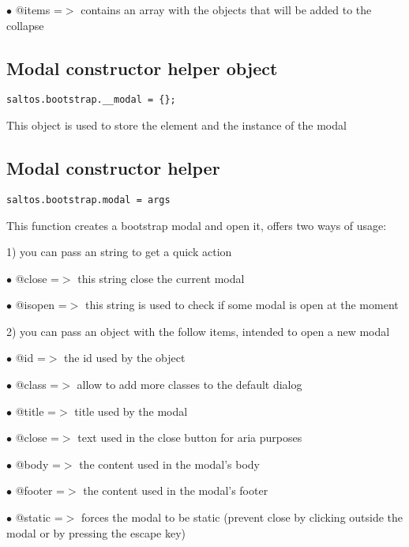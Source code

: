 \documentclass[a4paper]{book}
\begin{document}
\begin{compactitem}
\item[\color{myblue}$\bullet$] @items =$>$ contains an array with the objects that will be added to the collapse
\end{compactitem}

\hypertarget{toc473}{}
\subsection{Modal constructor helper object}

\begin{lstlisting}
saltos.bootstrap.__modal = {};
\end{lstlisting}

This object is used to store the element and the instance of the modal

\hypertarget{toc474}{}
\subsection{Modal constructor helper}

\begin{lstlisting}
saltos.bootstrap.modal = args
\end{lstlisting}

This function creates a bootstrap modal and open it, offers two ways of usage:

1) you can pass an string to get a quick action

\begin{compactitem}
\item[\color{myblue}$\bullet$] @close  =$>$ this string close the current modal
\item[\color{myblue}$\bullet$] @isopen =$>$ this string is used to check if some modal is open at the moment
\end{compactitem}

2) you can pass an object with the follow items, intended to open a new modal

\begin{compactitem}
\item[\color{myblue}$\bullet$] @id     =$>$ the id used by the object
\item[\color{myblue}$\bullet$] @class  =$>$ allow to add more classes to the default dialog
\item[\color{myblue}$\bullet$] @title  =$>$ title used by the modal
\item[\color{myblue}$\bullet$] @close  =$>$ text used in the close button for aria purposes
\item[\color{myblue}$\bullet$] @body   =$>$ the content used in the modal's body
\item[\color{myblue}$\bullet$] @footer =$>$ the content used in the modal's footer
\item[\color{myblue}$\bullet$] @static =$>$ forces the modal to be static (prevent close by clicking outside the modal or
           by pressing the escape key)
\end{compactitem}
\end{document}
